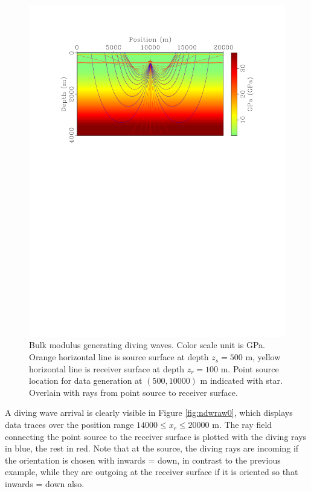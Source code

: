 \documentclass[georeport,12pt]{geophysics}
\begin{document}
\begin{figure}
  \includegraphics[width=\textwidth]{ooplrays0.pdf}
  \caption{Bulk modulus generating diving waves. Color scale unit is
    GPa. Orange horizontal line is source surface at depth $z_s= 500$
    m, yellow horizontal
    line is receiver surface at depth $z_r=100$ m. Point source location for data
    generation at $(500, 10000)$ m indicated with star. Overlain with rays from point
    source to receiver surface.}
  \label{fig:ooplrays0}
\end{figure}


A diving wave arrival is clearly visible in Figure
\ref{fig:ndwraw0}, which displays data traces over the position range $14000 \le
x_r \le 20000$ m. The ray field connecting the point source to the
receiver surface is plotted with the diving rays in blue, the rest in
red. Note that at the source, the diving rays are incoming if the
orientation is chosen with inwards = down, in contrast to the previous
example, while they are outgoing at
the receiver surface if it is oriented so that inwards = down also.
\end{document}
